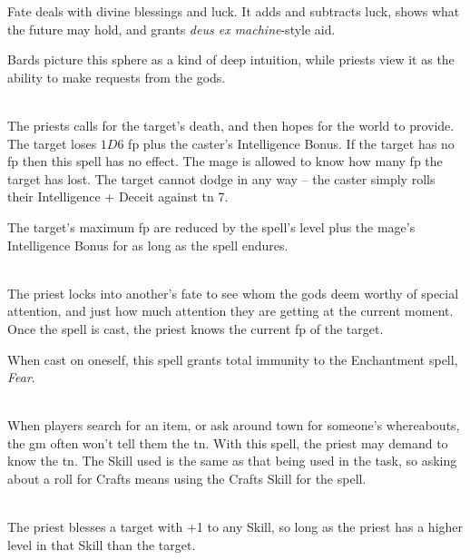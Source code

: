 \begin{multicols}{2}

\noindent
Fate deals with divine blessings and luck.
It adds and subtracts luck, shows what the future may hold, and grants \textit{deus ex machine}-style aid.

Bards picture this sphere as a kind of deep intuition, while priests view it as the ability to make requests from the gods.

\spelllevel

\\
The priests calls for the target's death, and then hopes for the world to provide.
The target loses $1D6$ \gls{fp} plus the caster's Intelligence Bonus.
If the target has no \gls{fp} then this spell has no effect.
The mage is allowed to know how many \gls{fp} the target has lost.
The target cannot dodge in any way -- the caster simply rolls their Intelligence + Deceit against \gls{tn} 7.

The target's maximum \gls{fp} are reduced by the spell's level plus the mage's Intelligence Bonus for as long as the spell endures.

\\
The priest locks into another's fate to see whom the gods deem worthy of special attention, and just how much attention they are getting at the current moment.
Once the spell is cast, the priest knows the current \gls{fp} of the target.

When cast on oneself, this spell grants total immunity to the Enchantment spell, \textit{Fear}.

\\
When players search for an item, or ask around town for someone's whereabouts, the \gls{gm} often won't tell them the \gls{tn}.  With this spell, the priest may demand to know the \gls{tn}.  The Skill used is the same as that being used in the task, so asking about a roll for Crafts means using the Crafts Skill for the spell.

\\
The priest blesses a target with +1 to any Skill, so long as the priest has a higher level in that Skill than the target.


\end{multicols}
